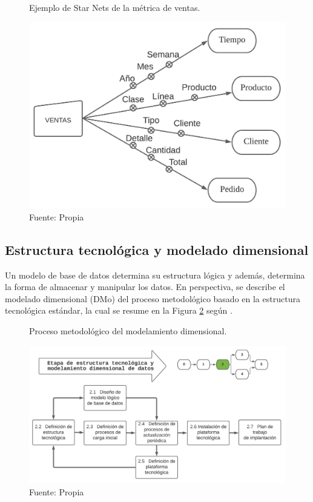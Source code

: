 \documentclass[12pt,jou]{apa7}
\begin{document}
\begin{figure}[h]
\caption{Ejemplo de Star Nets de la métrica de ventas.}
\centering
\includegraphics[width=1\linewidth]{Figuras/starNet} 
\caption*{ Fuente: Propia}
\label{fig: starnet}
\end{figure}


\subsection{Estructura tecnológica y modelado dimensional} 
Un modelo de base de datos determina su estructura lógica y además, determina la forma de almacenar y manipular los datos. En perspectiva, se describe el modelado dimensional (DMo) del proceso metodológico basado en la estructura tecnológica estándar, la cual se resume en la Figura \ref{fig: etapa2} según \cite{LaPlata}.

\begin{figure}[h]
\caption{Proceso metodológico del modelamiento dimensional.}
\centering
\includegraphics[width=1\linewidth]{Figuras/etapa2}
\caption*{ Fuente: Propia}
\label{fig: etapa2}
\end{figure}
\end{document}
